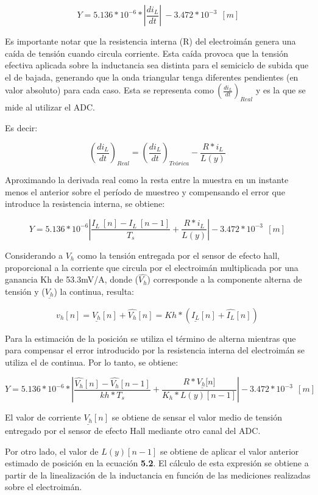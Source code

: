 \documentclass{article} %
\begin{document}
\noindent 
\[Y=5.136*10^{-6}*\left|\frac{{di}_L}{dt}\right|\ -3.472*10^{-3}\ \ [m]\] 


\noindent Es importante notar que la resistencia interna (R) del electroim\'{a}n genera una ca\'{i}da de tensi\'{o}n cuando circula corriente. Esta ca\'{i}da provoca que la tensi\'{o}n efectiva aplicada sobre la inductancia sea distinta para el semiciclo de subida que el de bajada, generando que la onda triangular tenga diferentes pendientes (en valor absoluto) para cada caso. Esta se representa como$\ (\frac{{di}_L}{dt})_{Real}$ y es la que se mide al utilizar el ADC.

\noindent 

\noindent Es decir:

\noindent 
\[(\frac{{di}_L}{dt})_{Real}=(\frac{{di}_L}{dt})_{Te\textrm{\'{o}}rica}-\frac{{R*i}_L}{L(y)}\ \] 


\noindent Aproximando la derivada real como la resta entre la muestra en un instante menos el anterior sobre el per\'{i}odo de muestreo y compensando el error que introduce la resistencia interna, se obtiene:

\noindent 
\[Y=5.136*10^{-6}\left|\frac{I_L\ [n]-I_L\ [n-1]}{T_s}+\frac{{R*i}_L}{L(y)}\right|-3.472*10^{-3}\ \ [m]\ \] 


\noindent Considerando a $V_h$ como la tensi\'{o}n entregada por el sensor de efecto hall, proporcional a la corriente que circula por el electroim\'{a}n multiplicada por una ganancia Kh de 53.3mV/A, donde  ($\widehat{V_h}$)  corresponde a la componente alterna de tensi\'{o}n y ($\underline{V_h}$) la continua, resulta:

\noindent 
\[v_h[n]=\underline{V_h}[n]+\widehat{V_h}[n]=Kh*(\underline{I_L}[n]+\widehat{I_L}[n])\ \] 


\noindent Para la estimaci\'{o}n de la posici\'{o}n se utiliza el t\'{e}rmino de alterna mientras que para compensar el error introducido por la resistencia interna del electroim\'{a}n se utiliza el de continua. Por lo tanto, se obtiene:

\noindent 
\[Y=5.136*10^{-6}*\left|\frac{\widehat{V_h}[n]-\widehat{V_h}[n-1]}{kh*T_s}+\frac{R*\underline{V_h[}n]}{K_h*L(y)[n-1]}\right|-3.472*10^{-3}\ \ [m]\ \] 


\noindent El valor de corriente $\underline{V_h}[n]$ se obtiene de sensar el valor medio de tensi\'{o}n entregado por el sensor de efecto Hall mediante otro canal del ADC.

\noindent 

\noindent Por otro lado, el valor de $L(y)[n-1]$ se obtiene de aplicar el valor anterior estimado de posici\'{o}n en la ecuaci\'{o}n\textbf{ 5.2}. El c\'{a}lculo de esta expresi\'{o}n se obtiene a partir de la linealizaci\'{o}n de la inductancia en funci\'{o}n de las mediciones realizadas sobre el electroim\'{a}n.
\end{document}

